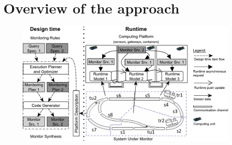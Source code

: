 
\chapter{Overview of the approach}



\begin{figure}[h]
	\begin{center}
		\includegraphics[width=\textwidth]{figures/fase-overview-crop.pdf}
	\end{center}
\end{figure}



